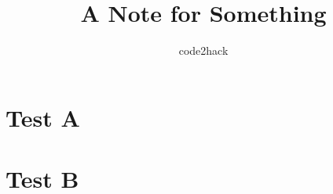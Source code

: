 \documentclass{article}
\title{A Note for Something}
\author{code2hack}
\date{}
\begin{document}
\maketitle
\tableofcontents

\section{Test A}
\section{Test B}
\end{document}
